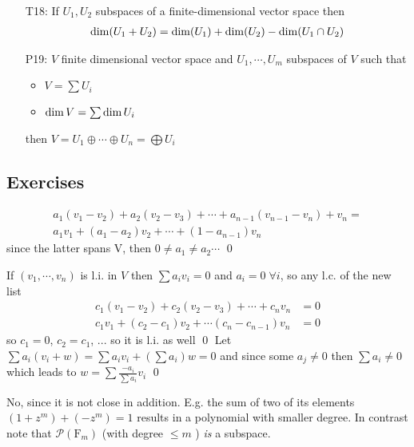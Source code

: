 \begin{itemize}
%
\item[T18:\label{it:T2_18}] If $U_1,U_2$ subspaces of a finite-dimensional vector space then 
\begin{align*}
\operatorname{dim}(U_1+U_2)=\operatorname{dim}(U_1)+\operatorname{dim}(U_2) - \operatorname{dim}(U_1\cap U_2)
\end{align*}
\item[P19:\label{it:T2_19}] $V$ finite dimensional vector space and $U_1,\cdots,U_m$ subspaces of $V$ such that 
\begin{itemize}
  \item $V=\sum U_i$
  \item $\operatorname{dim}{V}=\sum\operatorname{dim}{U_i}$
\end{itemize}
 then $V=U_1 \oplus \cdots \oplus U_n = \bigoplus U_i$
\end{itemize}



\subsection*{Exercises}
\exo{}
\begin{align*}
a_1(v_1 - v_2) + a_2 (v_2 - v_3) + \cdots + a_{n-1} (v_{n-1} - v_n) + v_n = \\
a_1 v_1 + (a_1 - a_2) v_2 + \cdots + (1 - a_{n-1}) v_n 
\end{align*}
since the latter spans V, then $0 \neq a_1\neq a_2 \cdots$ 
\qed

\exo{} If $(v_1,\cdots,v_n)$ is l.i. in $V$ then $\sum a_i v_i = 0$ and $a_i = 0\; \forall i$, so any l.c. of the new list 
\begin{align*}
  c_1 (v_1 - v_2) + c_2 (v_2 - v_3) + \cdots + c_n v_n &= 0\\
  c_1 v_1 + (c_2 - c_1) v_2 + \cdots (c_n - c_{n-1})v_n &= 0
\end{align*}
so $c_1=0$, $c_2 = c_1$, ...  so it is l.i. as well \qed
\exo{} Let $\sum a_i (v_i + w) = \sum a_i v_i + (\sum a_i) w = 0$ and since some $a_j\neq 0$ then $\sum a_i\neq 0$ 
which leads to $w = \sum \frac{-a_i}{\sum a_i} v_i$ \qed 

\exo{} No, since it is not close in addition. E.g. the sum of two of its elements $ (1 + z^m) + (- z^m) = 1  $ 
results in a polynomial with smaller degree. In contrast note that $\mathcal{P}(\mathrm{F}_m)$ (with degree $\leq m$ ) 
\emph{is} a subspace. 

